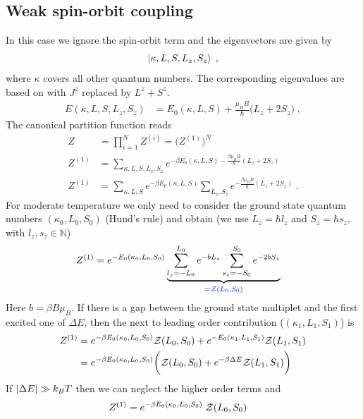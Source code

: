 \subsection{Weak spin-orbit coupling}
In this case we ignore the spin-orbit term and the eigenvectors are given by
%
\begin{align*}
\ket{\kappa,L,S,L_{z},S_{z}}\;,
\end{align*}
%
where $\kappa$ covers all other quantum numbers. The corresponding eigenvalues
are based on  with $J^{z}$ replaced by $L^{z}+S^{z}$.
%
\begin{align*}
E(\kappa,L,S,L_{z},S_{z}) &= E_{0}(\kappa,L,S) +\frac{\mu_{B} B}{\hbar}
\big( L_{z} + 2 S_{z}\big)\;,
\end{align*}
%
%
The canonical partition  function reads
%
\begin{align}\label{eq:}
Z &= \prod_{i=1}^{N} Z^{(i)} = \bigg(Z^{(1)}\bigg)^{N}\\
Z^{(1)} &= \sum_{\kappa,L,S,L_{z},S_{z}}
e^{-\beta E_{0}(\kappa,L,S) -\frac{\beta \mu_{B} B}{\hbar} (L_{z}+2S_{z})}\\
Z^{(1)} &= \sum_{\kappa,L,S}e^{-\beta E_{0}(\kappa,L,S)}
\sum_{L_{z},S_{z}}
e^{-\frac{\beta \mu_{B} B}{\hbar}(L_{z}+2S_{z})}\;.
\end{align}
%
 For moderate temperature we only need to consider the ground state quantum numbers $(\kappa_{0},L_{0},S_{0})$ (Hund's rule) and obtain
(we use $L_{z}=\hbar l_{z}$ and $S_{z}=\hbar s_{z}$, with $l_{z},s_{z}\in \mathbb N$)
%
\begin{align*}
Z^{(1)} &= e^{-E_{0}(\kappa_{0},L_{0},S_{0})} 
\underbrace{
\sum_{l_{z}=-L_{0}}^{L_{0}}e^{-b L_{z}}
\sum_{s_{z}=-S_{0}}^{S_{0}}e^{-2b S_{z}}
}_{\color{blue} = {\cal Z}(L_{0},S_{0})}
\end{align*}
%
Here $b=\beta B \mu_{B}$.
If there is a gap between the ground state multiplet and the first excited one of $\Delta E$,
then the next to leading order contribution ($(\kappa_{1},L_{1},S_{1})$) is
%
\begin{align*}
Z^{(1)}&= e^{-\beta E_{0}(\kappa_{0},L_{0},S_{0})}  {\cal Z}(L_{0},S_{0})
+e^{-E_{0}(\kappa_{1},L_{1},S_{1})}  {\cal Z}(L_{1},S_{1})\\
&= e^{-\beta E_{0}(\kappa_{0},L_{0},S_{0})} \bigg( {\cal Z}(L_{0},S_{0})
+e^{-\beta \Delta E}  {\cal Z}(L_{1},S_{1})\bigg)\\
\end{align*}
%
If $\abs{\Delta E}\gg k_{B}T$ then we can neglect the higher order terms and
\begin{align}
Z^{(1)} &= e^{-\beta E_{0}(\kappa_{0},L_{0},S_{0})} \;{\cal Z}(L_{0},S_{0})
\end{align}

